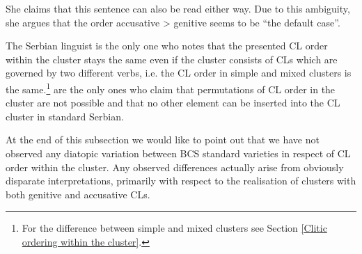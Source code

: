 \begin{exe}
\ex\begin{xlist}
\end{xlist}
\end{exe}

\noindent She claims that this sentence can also be read either way. Due to this ambiguity, she argues that the order accusative > genitive seems to be “the default case”.

The Serbian linguist \citet[291]{Popovic04} is the only one who notes that the presented CL order within the cluster stays the same even if the cluster consists of CLs which are governed by two different verbs, i.e. the CL order in simple and mixed clusters is the same.\footnote{For the difference between simple and mixed clusters see Section \ref{Clitic ordering within the cluster}.} \citet[660]{MrazovicVukadinovic09} are the only ones who claim that permutations of CL order in the cluster are not possible and that no other element can be inserted into the CL cluster in standard Serbian. 

At the end of this subsection we would like to point out that we have not observed any diatopic variation between BCS standard varieties in respect of CL order within the cluster. Any observed differences actually arise from obviously disparate interpretations, primarily with respect to the realisation of clusters with both genitive and accusative CLs.

